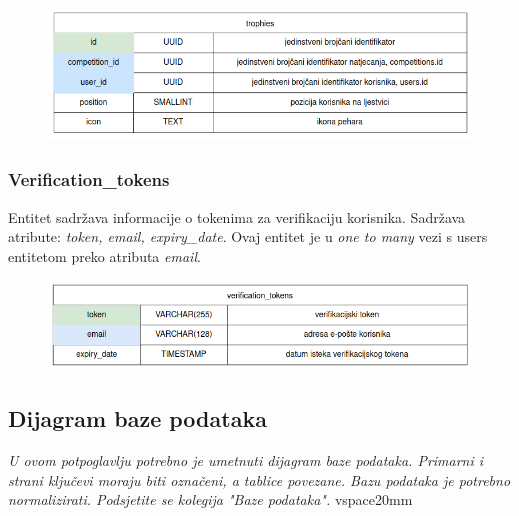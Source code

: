 				\vspace{20mm}

				\begin{figure}[htbp]
					\centering
					\includegraphics[width=\linewidth]{slike/trophies_tablica.png}
				\end{figure}

				\vspace{30mm}

				\subsubsection*{Verification\_tokens}

				Entitet  sadržava informacije o tokenima za verifikaciju korisnika. Sadržava atribute: \textit{token, email, expiry\_date}. Ovaj entitet je u \textit{one to many} vezi s users entitetom preko atributa \textit{email}.

				\vspace{20mm}

				\begin{figure}[htbp]
					\centering
					\includegraphics[width=\linewidth]{slike/verification_tokens_tablica.png}
				\end{figure}

				\vspace{30mm}

				\clearpage
				\subsection{Dijagram baze podataka}
				\textit{ U ovom potpoglavlju potrebno je umetnuti dijagram baze podataka. Primarni i strani ključevi moraju biti označeni, a tablice povezane. Bazu podataka je potrebno normalizirati. Podsjetite se kolegija "Baze podataka".}
				vspace{20mm}

